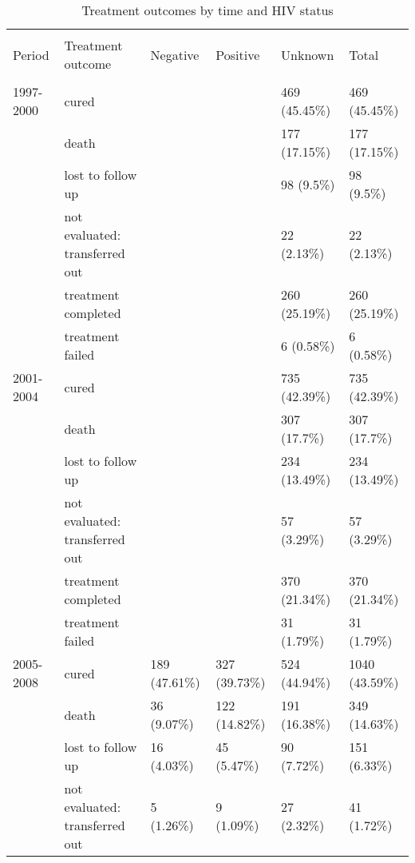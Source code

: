 \documentclass{article}
\begin{document}


\begin{landscape}





\begin{table}[!htbp] \centering 
  \caption{Treatment outcomes by time and HIV status} 
  \label{} 
\begin{tabular}{@{\extracolsep{5pt}} llllll} 
\\[-1.8ex]\hline 
\hline \\[-1.8ex] 
Period & Treatment outcome & Negative & Positive & Unknown & Total \\ 
\hline \\[-1.8ex] 
1997-2000 & cured &  &  & 469 (45.45\%) & 469 (45.45\%) \\ 
 & death &  &  & 177 (17.15\%) & 177 (17.15\%) \\ 
 & lost to follow up &  &  & 98 (9.5\%) & 98 (9.5\%) \\ 
 & not evaluated: transferred out &  &  & 22 (2.13\%) & 22 (2.13\%) \\ 
 & treatment completed &  &  & 260 (25.19\%) & 260 (25.19\%) \\ 
 & treatment failed &  &  & 6 (0.58\%) & 6 (0.58\%) \\ 
2001-2004 & cured &  &  & 735 (42.39\%) & 735 (42.39\%) \\ 
 & death &  &  & 307 (17.7\%) & 307 (17.7\%) \\ 
 & lost to follow up &  &  & 234 (13.49\%) & 234 (13.49\%) \\ 
 & not evaluated: transferred out &  &  & 57 (3.29\%) & 57 (3.29\%) \\ 
 & treatment completed &  &  & 370 (21.34\%) & 370 (21.34\%) \\ 
 & treatment failed &  &  & 31 (1.79\%) & 31 (1.79\%) \\ 
2005-2008 & cured & 189 (47.61\%) & 327 (39.73\%) & 524 (44.94\%) & 1040 (43.59\%) \\ 
 & death & 36 (9.07\%) & 122 (14.82\%) & 191 (16.38\%) & 349 (14.63\%) \\ 
 & lost to follow up & 16 (4.03\%) & 45 (5.47\%) & 90 (7.72\%) & 151 (6.33\%) \\ 
 & not evaluated: transferred out & 5 (1.26\%) & 9 (1.09\%) & 27 (2.32\%) & 41 (1.72\%) \\ 

\end{tabular}
\end{table}
\end{landscape}
\end{document}
